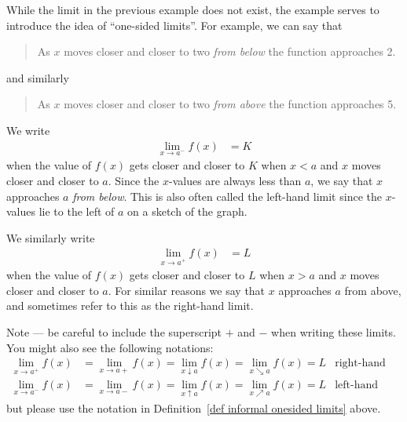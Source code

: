 While the limit in the previous example does not exist, the example serves to
introduce the idea of ``one-sided limits''. For example, we can say that
\begin{quote}
 As $x$ moves closer and closer to two \emph{from below} the function
approaches 2.
\end{quote}
and similarly
\begin{quote}
 As $x$ moves closer and closer to two \emph{from above} the function
approaches 5.
\end{quote}

\begin{defn}
\label{def informal onesided limits}
We write
\begin{align*}
\lim_{x \to a^-} f(x) &= K
\end{align*}
when the value of $f(x)$ gets closer and closer to $K$ when $x<a$ and $x$ moves
closer and closer to $a$. Since the $x$-values are always less than $a$, we say
that $x$ approaches $a$ \emph{from below}. This is also often called the
left-hand limit since the $x$-values lie to the left of $a$ on a sketch of the
graph.


We similarly write
\begin{align*}
\lim_{x \to a^+} f(x) &= L
\end{align*}
when the value of $f(x)$ gets closer and closer to $L$ when $x>a$ and $x$
moves closer and closer to $a$. For similar reasons we say that $x$ approaches
$a$ from above, and sometimes refer to this as the right-hand limit.
\end{defn}
Note --- be careful to include the superscript $+$ and $-$ when writing
these limits. You might also see the following notations:
\begin{align*}
\lim_{x \to a^+} f(x) &= \lim_{x \to a+} f(x) = \lim_{x \downarrow a} f(x) =
\lim_{x \searrow a} f(x) = L & \text{right-hand limit}\\
\lim_{x \to a^-} f(x) &= \lim_{x \to a-} f(x) = \lim_{x \uparrow a} f(x) =
\lim_{x \nearrow a} f(x) = L & \text{left-hand limit}
\end{align*}
but please use the notation in Definition~\ref{def informal onesided
limits} above.

